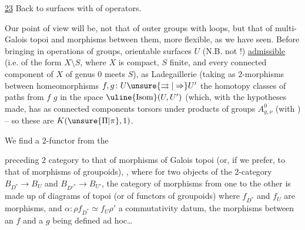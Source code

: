 \uline{23} Back to surfaces with  of operators.

Our point of view will be, not that of outer groups with loops, but that of multi-Galois topoi and morphisms between them, more flexible, as we have seen.
Before bringing in operations of groups,   orientable surfaces $U$ (N.B. not  !)   \uline{admissible} (i.e. of the form $X\setminus S$, where $X$ is compact, $S$ finite, and every connected component of $X$ of genus $0$ meets $S$), as  Ladegaillerie (taking as $2$-morphisms between  homeomorphisms $f,g\colon U\unsure{\rightrightarrows|\Rightarrow}U'$ the homotopy classes of paths from $f$  $g$ in the space $\uline{\mathrm{Isom}}(U,U')$ (which, with the hypotheses made, has as connected components  torsors under products of groups $A_{g,\nu}^0$ (with ) -- so these are $K(\unsure{\Pi|\pi},1)$.

We find a $2$-functor from the

preceding $2$ category to that of morphisms of Galois topoi (or, if we prefer, to that of morphisms of groupoids), 
,
where for two objects of the $2$-category $B_{D^*}\to B_U$ and $B_{D'^*}\to B_{U'}$, the category of morphisms from one to the other is made up of  diagrams   of topoi (or of functors of groupoids)
where $f_{D^*}$ and $f_U$ are morphisms, and \deleted{\unsure{$\alpha$}} $\alpha\colon\rho f_{D^*}\simeq f_U\rho'$ a commutativity datum,  the morphisms between an $f$ and a $g$ being defined ad hoc\ldots

